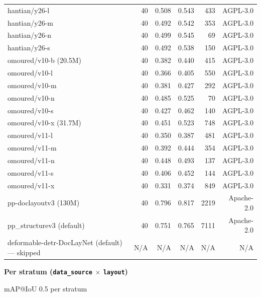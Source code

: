 \documentclass[border=2pt]{standalone}
\begin{document}
\begin{tabular}{lrrrrr}
hantian/y26-l & 40 & 0.508 & 0.543 & 433 & AGPL-3.0 \\
hantian/y26-m & 40 & 0.492 & 0.542 & 353 & AGPL-3.0 \\
hantian/y26-n & 40 & 0.499 & 0.545 & 69 & AGPL-3.0 \\
hantian/y26-s & 40 & 0.492 & 0.538 & 150 & AGPL-3.0 \\
omoured/v10-b (20.5M) & 40 & 0.382 & 0.440 & 415 & AGPL-3.0 \\
omoured/v10-l & 40 & 0.366 & 0.405 & 550 & AGPL-3.0 \\
omoured/v10-m & 40 & 0.381 & 0.427 & 292 & AGPL-3.0 \\
omoured/v10-n & 40 & 0.485 & 0.525 & 70 & AGPL-3.0 \\
omoured/v10-s & 40 & 0.427 & 0.462 & 140 & AGPL-3.0 \\
omoured/v10-x (31.7M) & 40 & 0.451 & 0.523 & 748 & AGPL-3.0 \\
omoured/v11-l & 40 & 0.350 & 0.387 & 481 & AGPL-3.0 \\
omoured/v11-m & 40 & 0.392 & 0.444 & 354 & AGPL-3.0 \\
omoured/v11-n & 40 & 0.448 & 0.493 & 137 & AGPL-3.0 \\
omoured/v11-s & 40 & 0.406 & 0.452 & 144 & AGPL-3.0 \\
omoured/v11-x & 40 & 0.331 & 0.374 & 849 & AGPL-3.0 \\
pp-doclayoutv3 (130M) & 40 & 0.796 & 0.817 & 2219 & Apache-2.0 \\
pp\_structurev3 (default) & 40 & 0.751 & 0.765 & 7111 & Apache-2.0 \\
deformable-detr-DocLayNet (default) — skipped & N/A & N/A & N/A & N/A & N/A \\
\bottomrule
\end{tabular}
\par{}

\par\textbf{Per stratum (\texttt{data\_source} $\times$ \texttt{layout})}
\par\smallskip mAP@IoU 0.5 per stratum
\end{document}
